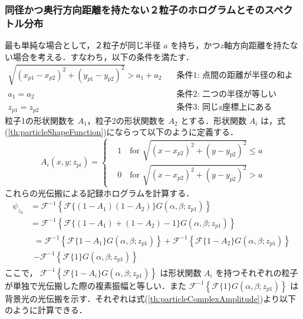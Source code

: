 \subsubsection{同径かつ奥行方向距離を持たない２粒子のホログラムとそのスペクトル分布}\label{sec:twoParticleHologram}
最も単純な場合として，２粒子が同じ半径 $a$ を持ち，かつ$z$軸方向距離を持たない場合を考える．すなわち，以下の条件を満たす．
\begin{align}
    \sqrt{(x_{p1}-x_{p2})^2+(y_{p1}-y_{p2})^2} > a_1+a_2  \quad &\text{条件1: 点間の距離が半径の和より大きい} \\
    a_1 = a_2 \quad &\text{条件2: 二つの半径が等しい} \\
    z_{p1} = z_{p2} \quad &\text{条件3: 同じz座標上にある}
\end{align}
粒子1の形状関数を $A_1$，粒子2の形状関数を $A_2$ とする．形状関数 $A_i$ は，式(\ref{th:particleShapeFunction})にならって以下のように定義する．
\begin{equation}
    \label{th:eachParticleShapeFunction}
    A_i(x,y;z_{pi}) = \left\{
    \begin{aligned}
        &1 \quad \text{for } \sqrt{(x-x_{p2})^2+(y-y_{p2})^2} \leq a \\
        &0 \quad \text{for } \sqrt{(x-x_{p2})^2+(y-y_{p2})^2} > a
    \end{aligned}
    \right.
\end{equation}
これらの光伝搬による記録ホログラムを計算する．
\begin{align}
    \psi_{z_0} &= \mathcal{F}^{-1}\left\{ \mathcal{F}\{(1-A_1)(1-A_2)\}G(\alpha,\beta;z_{p1}) \right\} \\
    &= \mathcal{F}^{-1}\left\{ \mathcal{F}\{(1-A_1)+(1-A_2)-1\}G(\alpha,\beta;z_{p1}) \right\} \\
    & \begin{multlined} = \mathcal{F}^{-1}\left\{ \mathcal{F}\{1-A_1\}G(\alpha,\beta;z_{p1}) \right\} + \mathcal{F}^{-1}\left\{ \mathcal{F}\{1-A_2\}G(\alpha,\beta;z_{p1}) \right\} \\ - \mathcal{F}^{-1}\left\{ \mathcal{F}\{1\}G(\alpha,\beta;z_{p1}) \right\} \end{multlined}
\end{align}
ここで， $\mathcal{F}^{-1}\left\{ \mathcal{F}\{1-A_i\}G(\alpha,\beta;z_{p1}) \right\}$ は形状関数 $A_i$ を持つそれぞれの粒子が単独で光伝搬した際の複素振幅と等しい．また  $\mathcal{F}^{-1}\left\{ \mathcal{F}\{1\}G(\alpha,\beta;z_{p1}) \right\}$ は背景光の光伝搬を示す．それぞれは式(\ref{th:particleComplexAmplitude})より以下のように計算できる．

